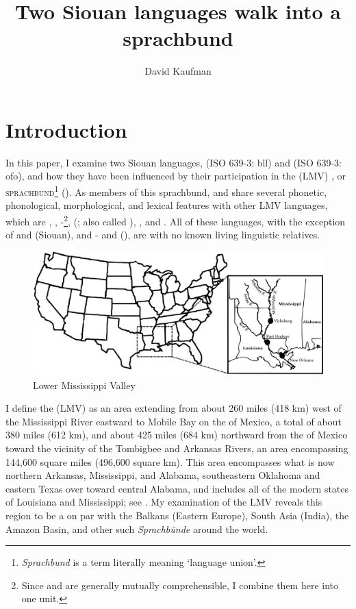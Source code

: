 \documentclass[output=paper]{LSP/langsci}
\author{David Kaufman}
\title{Two {Siouan} languages walk into a sprachbund}
\begin{document}
\section{Introduction}
In this paper, I examine two Siouan languages,  (ISO 639-3: bll) and  (ISO 639-3: ofo), and how they have been influenced by their participation in the  (LMV) , or \textsc{sprachbund}\footnote{\emph{Sprachbund} is a  term literally meaning `language union'.} (\citealt[3]{Kaufman2014}). As members of this sprachbund,  and  share several phonetic, phonological, morphological, and lexical features with other LMV languages, which are , , -\footnote{Since  and  are generally mutually comprehensible, I combine them here into one unit.},  (; also called ), , and . All of these languages, with the exception of  and  (Siouan), and - and  (), are  with no known living linguistic relatives. 

\begin{figure}
\caption{Lower Mississippi Valley} \label{map}
\includegraphics[width=12cm]{figures/Kaufman1}
\end{figure}

I define the  (LMV) as an area extending from about 260 miles (418 km) west of the Mississippi River eastward to Mobile Bay on the  of Mexico, a total of about 380 miles (612 km), and about 425 miles (684 km) northward from the  of Mexico toward the vicinity of the Tombigbee and Arkansas Rivers, an area encompassing 144,600 square miles (496,600 square km). This area encompasses what is now northern Arkansas, Mississippi, and Alabama, southeastern Oklahoma and eastern Texas over toward central Alabama, and includes all of the modern states of Louisiana and Mississippi; see . My examination of the LMV reveals this region to be a  on par with the Balkans (Eastern Europe), South Asia (India), the Amazon Basin, and other such \textit{Sprachbünde} around the world.
\end{document}

